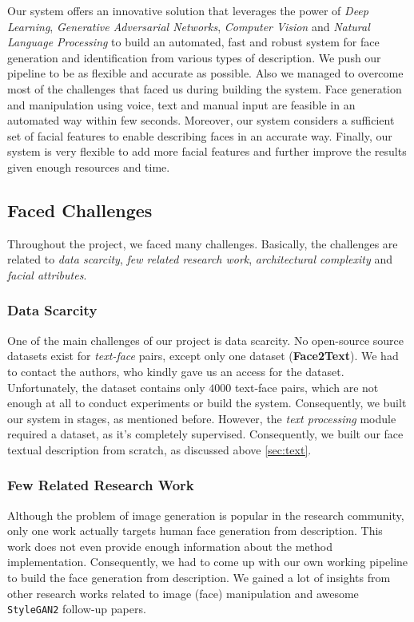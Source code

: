Our system offers an innovative solution that leverages the power of \emph{Deep Learning}, \emph{Generative Adversarial Networks}, \emph{Computer Vision} and \emph{Natural Language Processing} to build an automated, fast and robust system for face generation and identification from various types of description. We push our pipeline to be as flexible and accurate as possible. Also we managed to overcome most of the challenges that faced us during building the system. Face generation and manipulation using voice, text and manual input are feasible in an automated way within few seconds. Moreover, our system considers a sufficient set of facial features to enable describing faces in an accurate way. Finally, our system is very flexible to add more facial features and further improve the results given enough resources and time.

\subsection{Faced Challenges}
Throughout the project, we faced many challenges. Basically, the challenges are related to \emph{data scarcity}, \emph{few related research work}, \emph{architectural complexity} and \emph{facial attributes}.

\subsubsection{Data Scarcity}
One of the main challenges of our project is data scarcity. No open-source source datasets exist for \emph{text-face} pairs, except only one dataset (\textbf{Face2Text}). We had to contact the authors, who kindly gave us an access for the dataset. Unfortunately, the dataset contains only $4000$ text-face pairs, which are not enough at all to conduct experiments or build the system. Consequently, we built our system in stages, as mentioned before. However, the \emph{text processing} module required a dataset, as it's completely supervised. Consequently, we built our face textual description from scratch, as discussed above \ref{sec:text}.

\subsubsection{Few Related Research Work}
Although the problem of image generation is popular in the research community, only one work actually targets human face generation from description. This work \cite{wang2020faces} does not even provide enough information about the method implementation. Consequently, we had to come up with our own working pipeline to build the face generation from description. We gained a lot of insights from other research works related to image (face) manipulation and awesome \texttt{StyleGAN2} follow-up papers.

